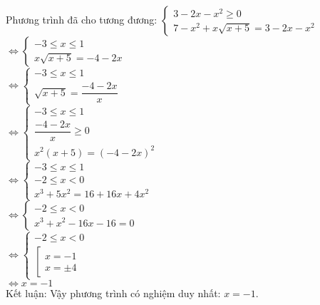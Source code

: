 \begin{Answer}{3}
    Phương trình đã cho tương đương:
    $
    \begin{cases}
        3-2x -x^2 \geq 0 \\
        7-x^2 + x \sqrt{x+5} = 3-2x -x^2
    \end{cases} $ \\

   $ \Leftrightarrow
    \begin{cases}
        -3 \leq x \leq 1 \\
        x \sqrt{x+5} = -4 -2x
    \end{cases} $  \\

     $ \Leftrightarrow
    \begin{cases}
        -3 \leq x \leq 1 \\
         \sqrt{x+5} = \dfrac{-4-2x}{x}
    \end{cases} $ \\

     $ \Leftrightarrow
    \begin{cases}
        -3 \leq x \leq 1 \\
        \dfrac{-4-2x}{x} \geq 0 \\
        x^2( x+5) = (-4-2x)^2
    \end{cases} $  \\

     $ \Leftrightarrow
    \begin{cases}
        -3 \leq x \leq 1 \\
        -2 \leq x <0 \\
        x^3 +5x^2 = 16 +16x +4x^2
    \end{cases} $ \\

     $ \Leftrightarrow
    \begin{cases}
        -2 \leq x <0 \\
        x^3 +x^2 -16x -16  =   0
    \end{cases} $ \\

    $ \Leftrightarrow
    \begin{cases}
        -2 \leq x <0 \\
        \left[
            \begin{array}{l}
                x=-1 \\
                x = \pm 4
            \end{array}
        \right.
    \end{cases} $ \\
    $ \Leftrightarrow x=-1 $ \\
    Kết luận: Vậy phương trình có nghiệm duy nhất: $ x=-1 $.
\end{Answer}
